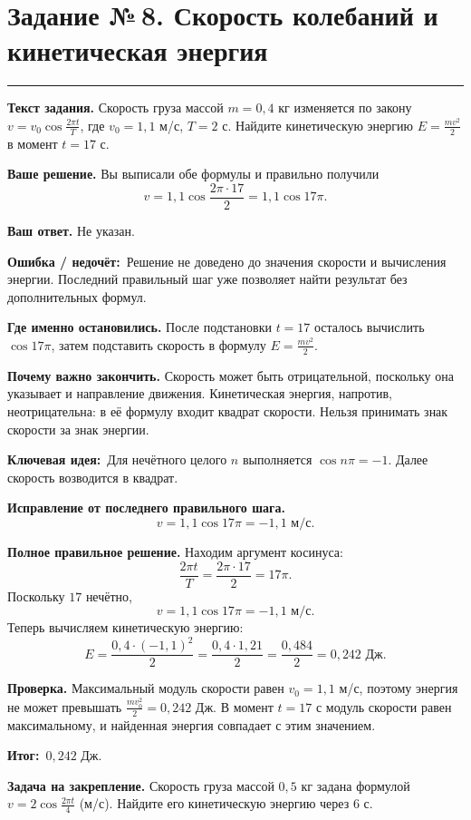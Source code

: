\documentclass[a4paper,11pt]{article}
\newcommand{\rlabel}[1]{\par\noindent\textbf{\color{darkaccent}#1}\quad}
\newcommand{\errorlabel}{\textcolor{err}{\textbf{Ошибка / недочёт:}}}
\newcommand{\keylabel}{\textcolor{blue!60!black}{\textbf{Ключевая идея:}}}
\newcommand{\finallabel}{\textcolor{teal!60!black}{\textbf{Итог:}}}
\newcommand{\tasktitle}[2]{\clearpage\phantomsection\label{task:#1}\section*{Задание №\,#1. #2}\vspace{-3mm}\textcolor{accent}{\rule{\linewidth}{0.45pt}}}
\begin{document}
\tasktitle{8}{Скорость колебаний и кинетическая энергия}
\rlabel{Текст задания.} Скорость груза массой $m=0{,}4$ кг изменяется по закону $v=v_0\cos\frac{2\pi t}{T}$, где $v_0=1{,}1$ м/с, $T=2$ с. Найдите кинетическую энергию $E=\frac{mv^2}{2}$ в момент $t=17$ с.
\rlabel{Ваше решение.} Вы выписали обе формулы и правильно получили
\[
v=1{,}1\cos\frac{2\pi\cdot17}{2}=1{,}1\cos17\pi.
\]
\rlabel{Ваш ответ.} Не указан.
\par\noindent\errorlabel\ Решение не доведено до значения скорости и вычисления энергии. Последний правильный шаг уже позволяет найти результат без дополнительных формул.
\rlabel{Где именно остановились.} После подстановки $t=17$ осталось вычислить $\cos17\pi$, затем подставить скорость в формулу $E=\frac{mv^2}{2}$.
\rlabel{Почему важно закончить.} Скорость может быть отрицательной, поскольку она указывает и направление движения. Кинетическая энергия, напротив, неотрицательна: в её формулу входит квадрат скорости. Нельзя принимать знак скорости за знак энергии.
\par\noindent\keylabel\ Для нечётного целого $n$ выполняется $\cos n\pi=-1$. Далее скорость возводится в квадрат.
\rlabel{Исправление от последнего правильного шага.}
\[
v=1{,}1\cos17\pi=-1{,}1\text{ м/с}.
\]
\rlabel{Полное правильное решение.} Находим аргумент косинуса:
\[
\frac{2\pi t}{T}=\frac{2\pi\cdot17}{2}=17\pi.
\]
Поскольку $17$ нечётно,
\[
v=1{,}1\cos17\pi=-1{,}1\text{ м/с}.
\]
Теперь вычисляем кинетическую энергию:
\[
E=\frac{0{,}4\cdot(-1{,}1)^2}{2}
=\frac{0{,}4\cdot1{,}21}{2}
=\frac{0{,}484}{2}=0{,}242\text{ Дж}.
\]
\rlabel{Проверка.} Максимальный модуль скорости равен $v_0=1{,}1$ м/с, поэтому энергия не может превышать $\frac{mv_0^2}{2}=0{,}242$ Дж. В момент $t=17$ с модуль скорости равен максимальному, и найденная энергия совпадает с этим значением.
\par\noindent\finallabel\ $\boxed{0{,}242\text{ Дж}}$.
\rlabel{Задача на закрепление.} Скорость груза массой $0{,}5$ кг задана формулой $v=2\cos\frac{2\pi t}{4}$ (м/с). Найдите его кинетическую энергию через $6$ с.
\end{document}
